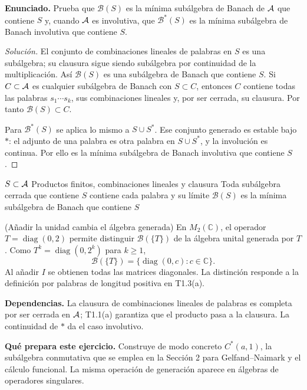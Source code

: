 \noindent\textbf{Enunciado.} Prueba que $\mathcal B(S)$ es la mínima subálgebra de Banach de $\mathcal A$ que contiene $S$ y, cuando $\mathcal A$ es involutiva, que $\mathcal B^*(S)$ es la mínima subálgebra de Banach involutiva que contiene $S$.

\begin{proof}[Solución]
El conjunto de combinaciones lineales de palabras en $S$ es una subálgebra; su clausura sigue
siendo subálgebra por continuidad de la multiplicación. Así $\mathcal B(S)$ es una subálgebra de
Banach que contiene $S$. Si $C\subset\mathcal A$ es cualquier subálgebra de Banach con $S\subset C$,
entonces $C$ contiene todas las palabras $s_1\cdots s_k$, sus combinaciones lineales y, por ser
cerrada, su clausura. Por tanto $\mathcal B(S)\subset C$.

Para $\mathcal B^*(S)$ se aplica lo mismo a $S\cup S^*$. Ese conjunto generado es estable bajo
$*$: el adjunto de una palabra es otra palabra en $S\cup S^*$, y la involución es continua. Por ello
es la mínima subálgebra de Banach involutiva que contiene $S$.
\end{proof}

\pagebreak
\proofdiagram
{$S\subset\mathcal A$}
{Productos finitos, combinaciones lineales y clausura}
{Toda subálgebra cerrada que contiene $S$ contiene cada palabra y su límite}
{$\mathcal B(S)$ es la mínima subálgebra de Banach que contiene $S$}

\begin{cthejemplo}{(Añadir la unidad cambia el álgebra generada)}
En $M_2(\mathbb C)$, el operador $T=\operatorname{diag}(0,2)$ permite distinguir
$\mathcal B(\{T\})$ de la álgebra unital generada por $T$.
Como $T^k=\operatorname{diag}(0,2^k)$ para $k\ge1$,
\[
 \mathcal B(\{T\})=\{\operatorname{diag}(0,c):c\in\mathbb C\}.
\]
Al añadir $I$ se obtienen todas las matrices diagonales. La distinción responde a la definición
por palabras de longitud positiva en T1.3(a).
\end{cthejemplo}

\noindent\textbf{Dependencias.} La clausura de combinaciones lineales de palabras es completa por ser cerrada en $\mathcal A$; T1.1(a) garantiza que el producto pasa a la clausura. La continuidad de $*$ da el caso involutivo.

\noindent\textbf{Qué prepara este ejercicio.} Construye de modo concreto $C^*(a,1)$, la subálgebra conmutativa que se emplea en la Sección 2 para Gelfand--Naimark y el cálculo funcional. La misma operación de generación aparece en álgebras de operadores singulares.

